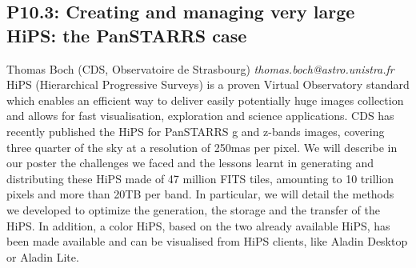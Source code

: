 \documentclass{report}
\begin{document}
\subsection*{P10.3: Creating and managing very large HiPS: the PanSTARRS case}
\bigskip
Thomas Boch (CDS, Observatoire de Strasbourg) \newline   \newline   \newline   \newline  \newline  \newline\newline
{\it thomas.boch@astro.unistra.fr}\newline
\newline\newline
HiPS (Hierarchical Progressive Surveys) is a proven Virtual Observatory standard which enables an efficient way to deliver easily potentially huge images collection and allows for fast visualisation, exploration and science applications. CDS has recently published the HiPS for PanSTARRS g and z-bands images, covering three quarter of the sky at a resolution of 250mas per pixel.
We will describe in our poster the challenges we faced and the lessons learnt in generating and distributing these HiPS made of 47 million FITS tiles, amounting to 10 trillion pixels and more than 20TB per band. In particular, we will detail the methods we developed to optimize the generation, the storage and the transfer of the HiPS.
In addition, a color HiPS, based on the two already available HiPS, has been made available and can be visualised from HiPS clients, like Aladin Desktop or Aladin Lite.\newline
\newpage
\end{document}
